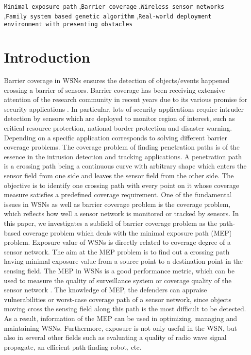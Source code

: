 \documentclass[final]{elsarticle}
\begin{document}
\begin{frontmatter}
\begin{abstract}
\end{abstract}
\begin{keyword}
\texttt{Minimal exposure path} \sep\texttt{Barrier coverage} \sep \texttt{Wireless sensor networks} \sep \texttt{Family system based genetic algorithm} \sep \texttt{Real-world deployment environment with presenting obstacles}
\end{keyword}
\end{frontmatter}
\section{Introduction}
Barrier coverage in WSNs ensures the detection of objects/events happened crossing a barrier of sensors. Barrier coverage has been receiving extensive attention of the research community in recent years due to its various promise for security applications \cite{wu2016survey,wang2011coverage,b15}. In particular, lots of security applications require intruder detection by sensors which are deployed to monitor region of interest, such as critical resource protection, national border protection and disaster warning. Depending on a specific application corresponds to solving different barrier coverage problems. The coverage problem of finding penetration paths is of the essence in the intrusion detection and tracking applications. A penetration path is a crossing path being a continuous curve with arbitrary shape which enters the sensor field from one side and leaves the sensor field from the other side. The objective is to identify one crossing path with every point on it whose coverage measure satisfies a predefined coverage requirement. One of the fundamental issues in WSNs as well as barrier coverage problem is the coverage problem, which reflects how well a sensor network is monitored or tracked by sensors. In this paper, we investigates a subfield of barrier coverage problem as the path-based coverage problem which deals with the minimal exposure path (MEP) problem. Exposure value of WSNs is directly related to coverage degree of a sensor network. The aim at the MEP problem is to find out a crossing path having minimal exposure value from a source point to a destination point in the sensing field. The MEP in WSNs is a good performance metric, which can be used to measure the quality of surveillance system or coverage quality of the sensor network \cite{b13,b17}. The knowledge of MEP, the defenders can appraise vulnerabilities or worst-case coverage path of a sensor network, since objects moving cross the sensing field along this path is the most difficult to be detected. As a result, information of the MEP can be used in optimizing, managing and maintaining WSNs. Furthermore, exposure is not only useful in the WSN, but also in several other fields such as evaluating a quality of radio wave signal propagate, an efficient path-finding robot, etc.
\end{document}
